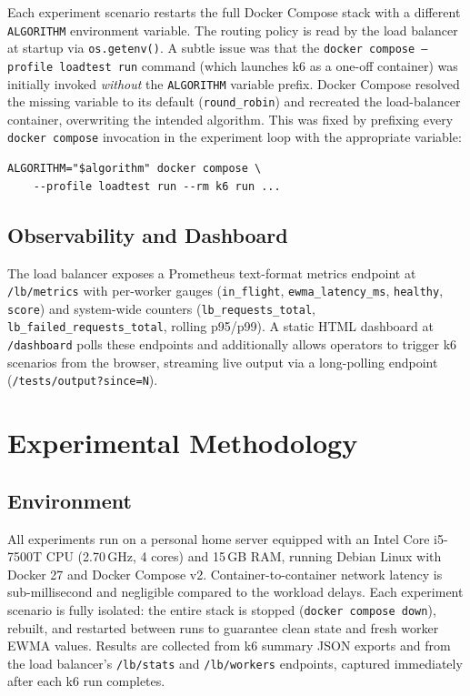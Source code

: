 \documentclass[conference]{IEEEtran}
\begin{document}
Each experiment scenario restarts the full Docker Compose stack with a
different \texttt{ALGORITHM} environment variable. The routing policy
is read by the load balancer at startup via \texttt{os.getenv()}. A
subtle issue was that the \texttt{docker compose --profile loadtest run}
command (which launches k6 as a one-off container) was initially invoked
\emph{without} the \texttt{ALGORITHM} variable prefix. Docker Compose
resolved the missing variable to its default (\texttt{round\_robin})
and recreated the load-balancer container, overwriting the intended
algorithm. This was fixed by prefixing every \texttt{docker compose}
invocation in the experiment loop with the appropriate variable:

\begin{lstlisting}
ALGORITHM="$algorithm" docker compose \
    --profile loadtest run --rm k6 run ...
\end{lstlisting}

\subsection{Observability and Dashboard}

The load balancer exposes a Prometheus text-format metrics endpoint at
\texttt{/lb/metrics} with per-worker gauges (\texttt{in\_flight},
\texttt{ewma\_latency\_ms}, \texttt{healthy}, \texttt{score}) and
system-wide counters (\texttt{lb\_requests\_total},
\texttt{lb\_failed\_requests\_total}, rolling p95/p99). A static HTML
dashboard at \texttt{/dashboard} polls these endpoints and additionally
allows operators to trigger k6 scenarios from the browser, streaming
live output via a long-polling endpoint (\texttt{/tests/output?since=N}).

\section{Experimental Methodology}

\subsection{Environment}

All experiments run on a personal home server equipped with an Intel
Core i5-7500T CPU (2.70\,GHz, 4 cores) and 15\,GB RAM, running Debian
Linux with Docker 27 and Docker Compose v2. Container-to-container
network latency is sub-millisecond and negligible compared to the
workload delays. Each experiment scenario is fully isolated: the entire
stack is stopped (\texttt{docker compose down}), rebuilt, and restarted
between runs to guarantee clean state and fresh worker EWMA values.
Results are collected from k6 summary JSON exports and from the load
balancer's \texttt{/lb/stats} and \texttt{/lb/workers} endpoints,
captured immediately after each k6 run completes.
\end{document}

